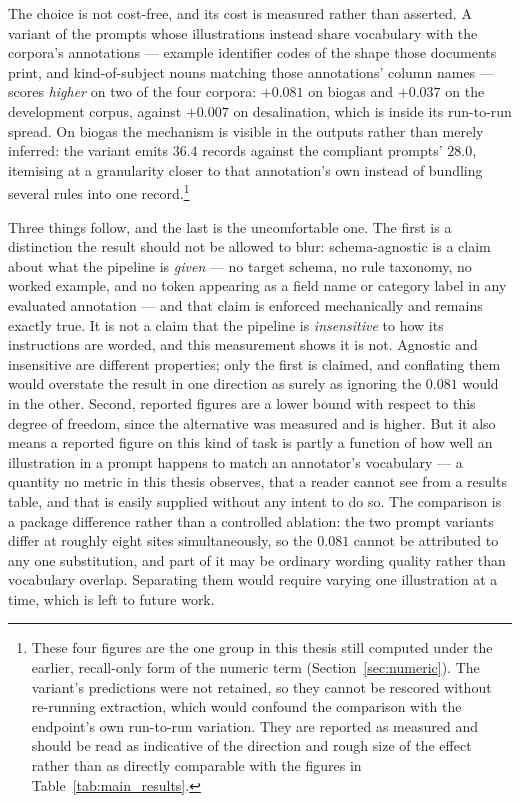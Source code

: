 \documentclass[11pt]{article}
\begin{document}
The choice is not cost-free, and its cost is measured rather than asserted. A
variant of the prompts whose illustrations instead share vocabulary with the
corpora's annotations --- example identifier codes of the shape those documents
print, and kind-of-subject nouns matching those annotations' column names ---
scores \emph{higher} on two of the four corpora: $+0.081$ on biogas and $+0.037$
on the development corpus, against $+0.007$ on desalination, which is inside its
run-to-run spread. On biogas the mechanism is visible in the outputs rather than
merely inferred: the variant emits $36.4$ records against the compliant prompts'
$28.0$, itemising at a granularity closer to that annotation's own instead of
bundling several rules into one record.\footnote{These four figures are the one
group in this thesis still computed under the earlier, recall-only form of the
numeric term (Section~\ref{sec:numeric}). The variant's predictions were not
retained, so they cannot be rescored without re-running extraction, which would
confound the comparison with the endpoint's own run-to-run variation. They are
reported as measured and should be read as indicative of the direction and rough
size of the effect rather than as directly comparable with the figures in
Table~\ref{tab:main_results}.}

Three things follow, and the last is the uncomfortable one. The first is a
distinction the result should not be allowed to blur: schema-agnostic is a claim
about what the pipeline is \emph{given} --- no target schema, no rule taxonomy,
no worked example, and no token appearing as a field name or category label in
any evaluated annotation --- and that claim is enforced mechanically and remains
exactly true. It is not a claim that the pipeline is \emph{insensitive} to how
its instructions are worded, and this measurement shows it is not. Agnostic and
insensitive are different properties; only the first is claimed, and conflating
them would overstate the result in one direction as surely as ignoring the
$0.081$ would in the other. Second, reported figures are a lower bound with
respect to this degree of freedom, since the alternative was measured and is
higher. But it also means a reported figure on
this kind of task is partly a function of how well an illustration in a prompt
happens to match an annotator's vocabulary --- a quantity no metric in this
thesis observes, that a reader cannot see from a results table, and that is
easily supplied without any intent to do so. The comparison is a package
difference rather than a controlled ablation: the two prompt variants differ at
roughly eight sites simultaneously, so the $0.081$ cannot be attributed to any
one substitution, and part of it may be ordinary wording quality rather than
vocabulary overlap. Separating them would require varying one illustration at a
time, which is left to future work.
\end{document}
